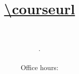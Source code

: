 
\nocite{eat-the-document, gatsby-trade, pynchon-paranoia, lot-49, gatsby-guide, felski-limits, paranoid-reading, latour-critique, python-nltk-cookbook, reading-machines, atp-massumi, reeve-python-nltk, nltk-book}






\title{\LARGE {\normalsize \textsc{\coursecode}\\} \HUGE \mytitle \\ \Large\url{\courseurl}}     
\author{\Large\instructor\\ \small\texttt{\noindent\instructoremail}}
\date{\courseterm. \courseroom \\ \coursetime \\ \small Office hours: \officehours}

\maketitle

